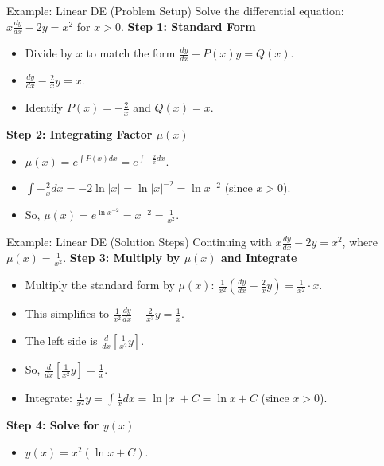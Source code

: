 \documentclass[10pt,aspectratio=169]{beamer}
\begin{document}
\begin{frame}{Example: Linear DE (Problem Setup)}
    Solve the differential equation: $x\frac{dy}{dx} - 2y = x^2$ for $x > 0$.
    \vspace{1em}
    \textbf{Step 1: Standard Form}
    \begin{itemize}
        \item Divide by $x$ to match the form $\frac{dy}{dx} + P(x)y = Q(x)$.
        \item $\frac{dy}{dx} - \frac{2}{x}y = x$.
        \item Identify $P(x) = -\frac{2}{x}$ and $Q(x) = x$.
    \end{itemize}
    \vspace{1em}
    \textbf{Step 2: Integrating Factor $\mu(x)$}
    \begin{itemize}
        \item $\mu(x) = e^{\int P(x)dx} = e^{\int -\frac{2}{x}dx}$.
        \item $\int -\frac{2}{x}dx = -2\ln|x| = \ln|x|^{-2} = \ln x^{-2}$ (since $x > 0$).
        \item So, $\mu(x) = e^{\ln x^{-2}} = x^{-2} = \frac{1}{x^2}$.
    \end{itemize}
\end{frame}

\begin{frame}{Example: Linear DE (Solution Steps)}
    Continuing with $x\frac{dy}{dx} - 2y = x^2$, where $\mu(x) = \frac{1}{x^2}$.
    \vspace{1em}
    \textbf{Step 3: Multiply by $\mu(x)$ and Integrate}
    \begin{itemize}
        \item Multiply the standard form by $\mu(x)$: $\frac{1}{x^2}\left(\frac{dy}{dx} - \frac{2}{x}y\right) = \frac{1}{x^2} \cdot x$.
        \item This simplifies to $\frac{1}{x^2}\frac{dy}{dx} - \frac{2}{x^3}y = \frac{1}{x}$.
        \item The left side is $\frac{d}{dx}\left[\frac{1}{x^2}y\right]$.
        \item So, $\frac{d}{dx}\left[\frac{1}{x^2}y\right] = \frac{1}{x}$.
        \item Integrate: $\frac{1}{x^2}y = \int \frac{1}{x}dx = \ln|x| + C = \ln x + C$ (since $x > 0$).
    \end{itemize}
    \vspace{1em}
    \textbf{Step 4: Solve for $y(x)$}
    \begin{itemize}
        \item $y(x) = x^2(\ln x + C)$.
    \end{itemize}
\end{frame}
\end{document}
